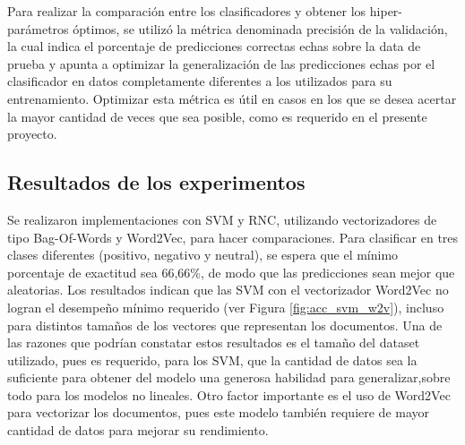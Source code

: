 \documentclass[conference]{IEEEtran}
\begin{document}
        Para realizar la comparación entre los clasificadores y obtener los hiper-parámetros óptimos, se utilizó la métrica denominada precisión de la validación, la cual indica el porcentaje de predicciones correctas echas sobre la data de prueba y apunta a optimizar la generalización de las predicciones echas por el clasificador en datos completamente diferentes a los utilizados para su entrenamiento. Optimizar esta métrica es útil en casos en los que se desea acertar la mayor cantidad de veces que sea posible, como es requerido en el presente proyecto.
    
    
    
    
    \subsection{Resultados de los experimentos}
    
        Se realizaron implementaciones con SVM y RNC, utilizando vectorizadores de tipo Bag-Of-Words y Word2Vec, para hacer comparaciones. Para clasificar en tres clases diferentes (positivo, negativo y neutral), se espera que el mínimo porcentaje de exactitud sea 66,66\%, de modo que las predicciones sean mejor que aleatorias. Los resultados indican que las SVM con el vectorizador Word2Vec no logran el desempeño mínimo requerido (ver Figura \ref{fig:acc_svm_w2v}), incluso para distintos tamaños de los vectores que representan los documentos. Una de las razones que podrían constatar estos resultados es el tamaño del dataset utilizado, pues es requerido, para los SVM, que la cantidad de datos sea la suficiente para obtener del modelo una generosa habilidad para generalizar,sobre todo para los modelos no lineales. Otro factor importante es el uso de Word2Vec para vectorizar los documentos, pues este modelo también requiere de mayor cantidad de datos para mejorar su rendimiento.
    
\end{document}
